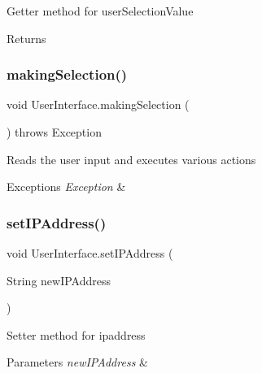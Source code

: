 Getter method for user\+Selection\+Value \begin{DoxyReturn}{Returns}

\end{DoxyReturn}
\mbox{\label{class_user_interface_a8f5f6e741f0ecc16317d6425fc13ae09}} 
\subsubsection{\texorpdfstring{making\+Selection()}{makingSelection()}}
{\footnotesize\ttfamily void User\+Interface.\+making\+Selection (\begin{DoxyParamCaption}{ }\end{DoxyParamCaption}) throws Exception\hspace{0.3cm}{\ttfamily [inline]}}

Reads the user input and executes various actions 
\begin{DoxyExceptions}{Exceptions}
{\em Exception} & \\
\hline
\end{DoxyExceptions}
\mbox{\label{class_user_interface_a4e49fde80d037d038d9c73db9d04e196}} 
\subsubsection{\texorpdfstring{set\+I\+P\+Address()}{setIPAddress()}}
{\footnotesize\ttfamily void User\+Interface.\+set\+I\+P\+Address (\begin{DoxyParamCaption}\item[{String}]{new\+I\+P\+Address }\end{DoxyParamCaption})\hspace{0.3cm}{\ttfamily [inline]}}

Setter method for ipaddress 
\begin{DoxyParams}{Parameters}
{\em new\+I\+P\+Address} & \\
\hline
\end{DoxyParams}
\mbox{\label{class_user_interface_af822b7fc2dbee940ad4892bd2e27d5ae}} 
